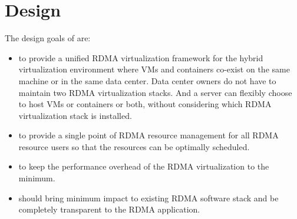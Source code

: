 \section{Design} \label{design}


The design goals of \sys are: 
\begin{itemize}
	\item to provide a unified RDMA virtualization framework for the hybrid virtualization environment where VMs and containers co-exist on the same machine or in the same data center. Data center owners do not have to maintain two RDMA virtualization stacks. And a server can flexibly choose to host VMs or containers or both, without considering which RDMA virtualization stack is installed.
	\item to provide a single point of RDMA resource management for all RDMA resource users so that the resources can be optimally scheduled.
	\item to keep the performance overhead of the RDMA virtualization to the minimum.
	\item \sys should bring minimum impact to existing RDMA software stack and be completely transparent to the RDMA application.
\end{itemize}


